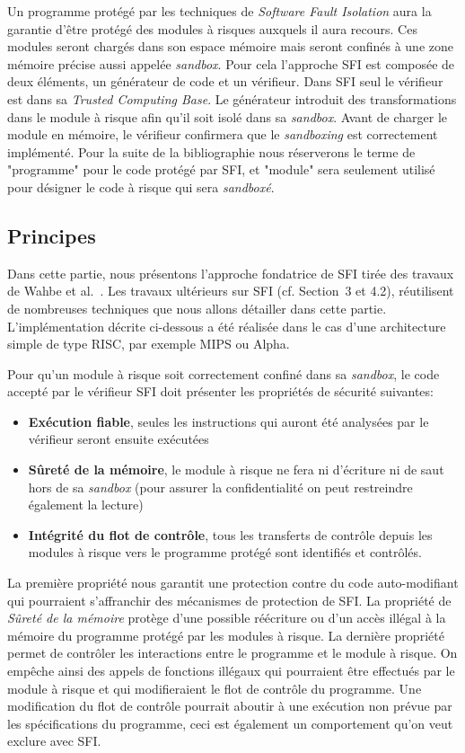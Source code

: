 \documentclass[11pt]{sdm}
\begin{document}
Un programme protégé par les techniques de \textit{Software Fault Isolation} aura la garantie d'être protégé des modules à risques auxquels il aura recours. Ces modules seront chargés dans son espace mémoire mais seront confinés à une zone mémoire précise aussi appelée \textit{sandbox}. Pour cela l'approche SFI est composée de deux éléments, un générateur de code et un vérifieur. Dans SFI seul le vérifieur est dans sa \textit{Trusted Computing Base}. Le générateur introduit des transformations dans le module à risque afin qu'il soit isolé dans sa \textit{sandbox}. Avant de charger le module en mémoire, le vérifieur confirmera que le \textit{sandboxing} est correctement implémenté.
Pour la suite de la bibliographie nous réserverons le terme de "programme" pour le code protégé par SFI, et "module" sera seulement utilisé pour désigner le code à risque qui sera \textit{sandboxé}.


\subsection{Principes}

Dans cette partie, nous présentons l'approche fondatrice de SFI tirée des travaux de Wahbe et al.~\cite{Wahbe:1993:ESF:173668.168635}. Les travaux ultérieurs sur SFI (cf. Section~3 et 4.2), réutilisent de nombreuses techniques que nous allons détailler dans cette partie. L'implémentation décrite ci-dessous a été réalisée dans le cas d'une architecture simple de type RISC, par exemple MIPS ou Alpha.

Pour qu'un module à risque soit correctement confiné dans sa \textit{sandbox}, le code accepté par le vérifieur SFI doit présenter les propriétés de sécurité suivantes:
\begin{itemize}
	\item \textbf{Exécution fiable}, seules les instructions qui auront été analysées par le vérifieur seront ensuite exécutées
	\item \textbf{Sûreté de la mémoire}, le module à risque ne fera ni d'écriture ni de saut hors de sa \textit{sandbox} (pour assurer la confidentialité on peut restreindre également la lecture)
	\item \textbf{Intégrité du flot de contrôle}, tous les transferts de contrôle depuis les modules à risque vers le programme protégé sont identifiés et contrôlés.
\end{itemize}

La première propriété nous garantit une protection contre du code auto-modifiant qui pourraient s'affranchir des mécanismes de protection de SFI. La propriété de \textit{Sûreté de la mémoire} protège d'une possible réécriture ou d'un accès illégal à la mémoire du programme protégé par les modules à risque. La dernière propriété permet de contrôler les interactions entre le programme et le module à risque. On empêche ainsi des appels de fonctions illégaux qui pourraient être effectués par le module à risque et qui modifieraient le flot de contrôle du programme. Une modification du flot de contrôle pourrait aboutir à une exécution non prévue par les spécifications du programme, ceci est également un comportement qu'on veut exclure avec SFI.
\end{document}
